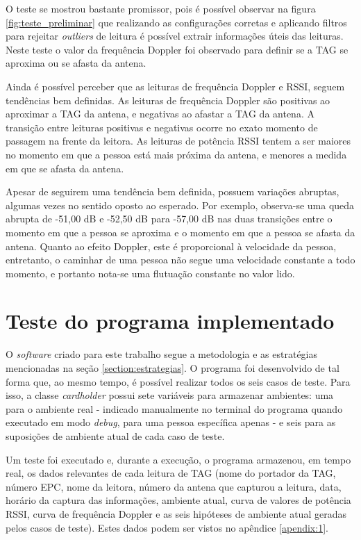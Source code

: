  O teste se mostrou bastante promissor, pois é possível observar na figura \ref{fig:teste_preliminar} que realizando as configurações corretas e aplicando filtros para rejeitar \textit{outliers} de leitura é possível extrair informações úteis das leituras. Neste teste o valor da frequência Doppler foi observado para definir se a TAG se aproxima ou se afasta da antena.
 
 Ainda é possível perceber que as leituras de frequência Doppler e RSSI, seguem tendências bem definidas. As leituras de frequência Doppler são positivas ao aproximar a TAG da antena, e negativas ao afastar a TAG da antena. A transição entre leituras positivas e negativas ocorre no exato momento de passagem na frente da leitora. As leituras de potência RSSI tentem a ser maiores no momento em que a pessoa está mais próxima da antena, e menores a medida em que se afasta da antena.
 
 Apesar de seguirem uma tendência bem definida, possuem variações abruptas, algumas vezes no sentido oposto ao esperado. Por exemplo, observa-se uma queda abrupta de -51,00 dB e -52,50 dB para -57,00 dB nas duas transições entre o momento em que a pessoa se aproxima e o momento em que a pessoa se afasta da antena. Quanto ao efeito Doppler, este é proporcional à velocidade da pessoa, entretanto, o caminhar de uma pessoa não segue uma velocidade constante a todo momento, e portanto nota-se uma flutuação constante no valor lido.

\section{Teste do programa implementado}

O \textit{software} criado para este trabalho segue a metodologia e as estratégias mencionadas na seção \ref{section:estrategias}. O programa foi desenvolvido de tal forma que, ao mesmo tempo, é possível realizar todos os seis casos de teste. Para isso, a classe \textit{cardholder} possui sete variáveis para armazenar ambientes: uma para o ambiente real - indicado manualmente no terminal do programa quando executado em modo \textit{debug}, para uma pessoa específica apenas - e seis para as suposições de ambiente atual de cada caso de teste.

Um teste foi executado e, durante a execução, o programa armazenou, em tempo real, os dados relevantes de cada leitura de TAG (nome do portador da TAG, número EPC, nome da leitora, número da antena que capturou a leitura, data, horário da captura das informações, ambiente atual, curva de valores de potência RSSI, curva de frequência Doppler e as seis hipóteses de ambiente atual geradas pelos casos de teste). Estes dados podem ser vistos no apêndice \ref{apendix:1}.

